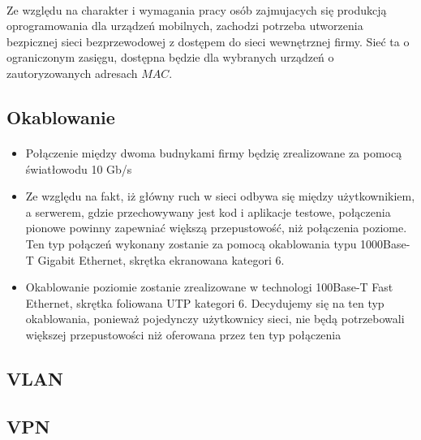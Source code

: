 \paragraph{}
Ze względu na charakter i wymagania pracy osób zajmujacych się produkcją oprogramowania dla urządzeń mobilnych, zachodzi potrzeba utworzenia bezpicznej sieci bezprzewodowej z dostępem do sieci wewnętrznej firmy. Sieć ta o ograniczonym zasięgu, dostępna będzie dla wybranych urządzeń o zautoryzowanych adresach $MAC$.

\subsection{Okablowanie}
\paragraph{}


\begin{itemize}
  \item Połączenie między dwoma budnykami firmy będzię zrealizowane za pomocą światłowodu 10 Gb/s

  \item Ze względu na fakt, iż główny ruch w sieci odbywa się między użytkownikiem, a serwerem, gdzie przechowywany jest kod i aplikacje testowe, połączenia pionowe powinny zapewniać większą przepustowość, niż połączenia  poziome. Ten typ połączeń wykonany zostanie za pomocą okablowania typu 1000Base-T Gigabit Ethernet, skrętka ekranowana kategori 6. 

  \item Okablowanie poziomie zostanie zrealizowane w technologi 100Base-T Fast Ethernet, skrętka foliowana UTP kategori 6. Decydujemy się na ten typ okablowania, ponieważ pojedynczy użytkownicy sieci, nie będą potrzebowali większej przepustowości niż oferowana przez ten typ połączenia

\end{itemize}

\subsection{VLAN}

\subsection{VPN}

